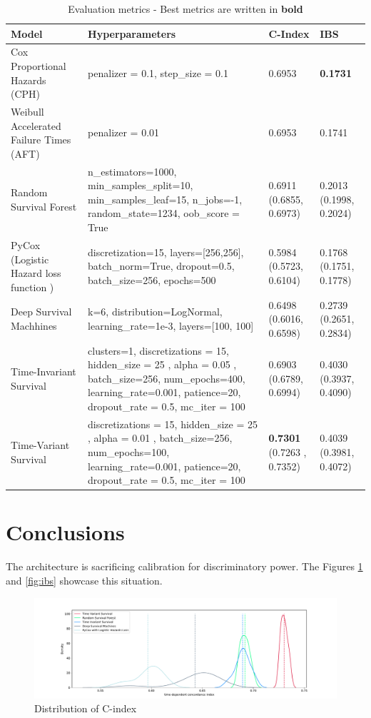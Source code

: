 \documentclass[%
 reprint,
 amsmath,amssymb,
 aps,nofootinbib
]{revtex4-2}
\begin{document}
\begin{table}[t]
  \centering
  \begin{tabular}{|p{4cm}|p{10cm}|p{1.5cm}|p{1.5cm}|}
     \hline
    \textbf{Model} & \textbf{Hyperparameters} & \textbf{C-Index} & \textbf{IBS} \\
    \hline
    Cox Proportional Hazards (CPH) & penalizer = 0.1, step\_size = 0.1 & 0.6953 & \textbf{0.1731}\\
    \hline
    Weibull Accelerated Failure Times (AFT) & penalizer = 0.01  & 0.6953 & 0.1741\\
    \hline
    Random Survival Forest & n\_estimators=1000, min\_samples\_split=10, min\_samples\_leaf=15, n\_jobs=-1, random\_state=1234, oob\_score = True  & 0.6911 (0.6855, 0.6973) & 0.2013 (0.1998, 0.2024)\\
    \hline
    PyCox (Logistic Hazard loss function \cite{kvamme_continuous_2019}) & discretization=15, layers=[256,256],  batch\_norm=True, dropout=0.5, batch\_size=256, epochs=500 & 0.5984 (0.5723, 0.6104)& 0.1768 (0.1751, 0.1778)\\
    \hline
    Deep Survival Machhines & k=6, distribution=LogNormal, learning\_rate=1e-3, layers=[100, 100] & 0.6498 (0.6016, 0.6598) & 0.2739 (0.2651, 0.2834)\\
    \hline
    Time-Invariant Survival & clusters=1, discretizations = 15, hidden\_size = 25 , alpha = 0.05 , batch\_size=256, num\_epochs=400, learning\_rate=0.001, patience=20, dropout\_rate = 0.5, mc\_iter = 100 & 0.6903 (0.6789, 0.6994) &0.4030 (0.3937, 0.4090) \\
    \hline
    Time-Variant Survival & discretizations = 15, hidden\_size = 25 , alpha = 0.01 , batch\_size=256, num\_epochs=100, learning\_rate=0.001, patience=20, dropout\_rate = 0.5, mc\_iter = 100  & \textbf{0.7301} (0.7263 , 0.7352) & 0.4039 (0.3981, 0.4072)\\
    \hline
  \end{tabular}
  \caption{Evaluation metrics - Best metrics are written in \textbf{bold}}
  \label{tab:eval}
\end{table}

\section{\label{conc}Conclusions}
The architecture is sacrificing calibration for discriminatory power. The Figures \ref{fig:cindex} and \ref{fig:ibs} showcase this situation.

\begin{figure}[t]
  \centering
  \includegraphics[width=\textwidth]{cindex_score_dist_plot.pdf}
  \caption{Distribution of C-index}
  \label{fig:cindex}
\end{figure}
\end{document}
